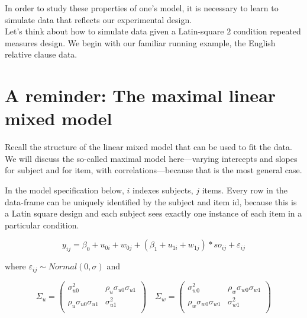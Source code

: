 \documentclass[12pt,]{krantz}
\begin{document}
In order to study these properties of one's model, it is necessary to learn to simulate data that reflects our experimental design.\\
Let's think about how to simulate data given a Latin-square \(2\) condition repeated measures design. We begin with our familiar running example, the \citet{grodner} English relative clause data.

\hypertarget{a-reminder-the-maximal-linear-mixed-model}{%
\section{A reminder: The maximal linear mixed model}\label{a-reminder-the-maximal-linear-mixed-model}}

Recall the structure of the linear mixed model that can be used to fit the \citet{grodner} data. We will discuss the so-called maximal model here---varying intercepts and slopes for subject and for item, with correlations---because that is the most general case.

In the model specification below, \(i\) indexes subjects, \(j\) items. Every row in the data-frame can be uniquely identified by the subject and item id, because this is a Latin square design and each subject sees exactly one instance of each item in a particular condition.

\begin{equation}
y_{ij} = \beta_0 + u_{0i} + w_{0j} + (\beta_1 + u_{1i} + w_{1j}) * so_{ij} + \varepsilon_{ij}
\end{equation}

where \(\varepsilon_{ij} \sim Normal(0,\sigma)\) and

\begin{equation}\label{eq:covmatsimulations}
\Sigma_u
=
\begin{pmatrix}
\sigma _{u0}^2  & \rho _{u}\sigma _{u0}\sigma _{u1}\\
\rho _{u}\sigma _{u0}\sigma _{u1}    & \sigma _{u1}^2\\
\end{pmatrix}
\quad 
\Sigma _w
=
\begin{pmatrix}
\sigma _{w0}^2  & \rho _{w}\sigma _{w0}\sigma _{w1}\\
\rho _{w}\sigma _{w0}\sigma _{w1}    & \sigma _{w1}^2\\
\end{pmatrix}
\end{equation}
\end{document}
